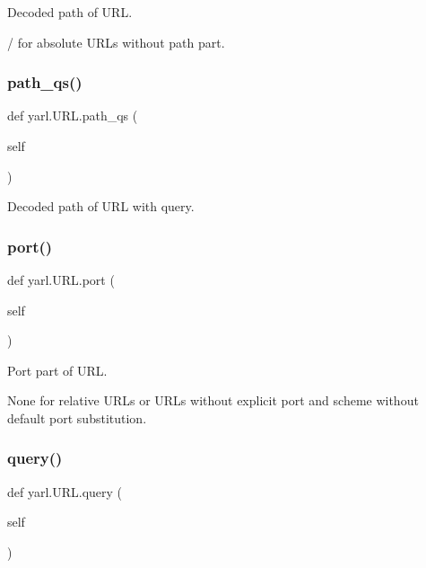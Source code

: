 \begin{DoxyVerb}Decoded path of URL.

/ for absolute URLs without path part.\end{DoxyVerb}
 \mbox{\label{classyarl_1_1_u_r_l_a56caa87073c917e7dd92b5c244940696}} 
\subsubsection{\texorpdfstring{path\+\_\+qs()}{path\_qs()}}
{\footnotesize\ttfamily def yarl.\+U\+R\+L.\+path\+\_\+qs (\begin{DoxyParamCaption}\item[{}]{self }\end{DoxyParamCaption})}

\begin{DoxyVerb}Decoded path of URL with query.\end{DoxyVerb}
 \mbox{\label{classyarl_1_1_u_r_l_a2bed00dab0bfcc9bcdfe9d472a4a445d}} 
\subsubsection{\texorpdfstring{port()}{port()}}
{\footnotesize\ttfamily def yarl.\+U\+R\+L.\+port (\begin{DoxyParamCaption}\item[{}]{self }\end{DoxyParamCaption})}

\begin{DoxyVerb}Port part of URL.

None for relative URLs or URLs without explicit port and
scheme without default port substitution.\end{DoxyVerb}
 \mbox{\label{classyarl_1_1_u_r_l_a10122ffc37115834b1e40e10b92f24cc}} 
\subsubsection{\texorpdfstring{query()}{query()}}
{\footnotesize\ttfamily def yarl.\+U\+R\+L.\+query (\begin{DoxyParamCaption}\item[{}]{self }\end{DoxyParamCaption})}


